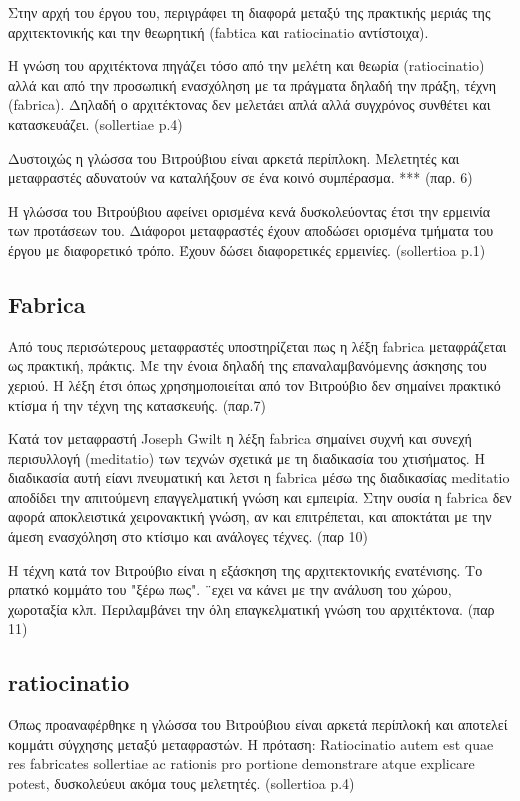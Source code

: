 Στην αρχή του έργου του, περιγράφει τη διαφορά μεταξύ της πρακτικής μεριάς της
αρχιτεκτονικής και την θεωρητική (fabtica και ratiocinatio αντίστοιχα).

Η γνώση του αρχιτέκτονα πηγάζει τόσο από την μελέτη και θεωρία (ratiocinatio)
αλλά και από την προσωπική ενασχόληση με τα πράγματα δηλαδή την πράξη, τέχνη
(fabrica). Δηλαδή ο αρχιτέκτονας δεν μελετάει απλά αλλά συγχρόνος συνθέτει και
κατασκευάζει. (sollertiae p.4)

Δυστοιχώς η γλώσσα του Βιτρούβιου είναι αρκετά περίπλοκη. Μελετητές και
μεταφραστές αδυνατούν να καταλήξουν σε ένα κοινό συμπέρασμα. *** (παρ. 6)

Η γλώσσα του Βιτρούβιου αφείνει ορισμένα κενά δυσκολεύοντας έτσι την ερμεινία
των προτάσεων του. Διάφοροι μεταφραστές έχουν αποδώσει ορισμένα τμήματα του
έργου με διαφορετικό τρόπο. Έχουν δώσει διαφορετικές ερμεινίες. (sollertioa p.1)

\subsection{Fabrica}

Από τους περισώτερους μεταφραστές υποστηρίζεται πως η λέξη fabrica μεταφράζεται
ως πρακτική, πράκτις. Με την ένοια δηλαδή της επαναλαμβανόμενης άσκησης του
χεριού. Η λέξη έτσι όπως χρησημοποιείται από τον Βιτρούβιο δεν σημαίνει πρακτικό
κτίσμα ή την τέχνη της κατασκευής. (παρ.7)

Κατά τον μεταφραστή Joseph Gwilt η λέξη fabrica σημαίνει συχνή και συνεχή
περισυλλογή (meditatio) των τεχνών σχετικά με τη διαδικασία του χτισήματος. Η
διαδικασία αυτή είανι πνευματική και λετσι η fabrica μέσω της διαδικασίας
meditatio αποδίδει την απιτούμενη επαγγελματική γνώση και εμπειρία. Στην ουσία η
fabrica δεν αφορά αποκλειστικά χειρονακτική γνώση, αν και επιτρέπεται, και
αποκτάται με την άμεση ενασχόληση στο κτίσιμο και ανάλογες τέχνες. (παρ 10)

Η τέχνη κατά τον Βιτρούβιο είναι η εξάσκηση της αρχιτεκτονικής ενατένισης. Το
ρπατκό κομμάτο του "ξέρω πως". ¨εχει να κάνει με την ανάλυση του χώρου,
χωροταξία κλπ. Περιλαμβάνει την όλη επαγκελματική γνώση του αρχιτέκτονα. (παρ
11)

\subsection{ratiocinatio}

Όπως προαναφέρθηκε η γλώσσα του Βιτρούβιου είναι αρκετά περίπλοκή και αποτελεί
κομμάτι σύγχησης μεταξύ μεταφραστών. Η πρόταση:  Ratiocinatio autem est quae res
fabricates sollertiae ac
rationis pro portione demonstrare atque explicare potest, δυσκολεύευι ακόμα τους
μελετητές. (sollertioa p.4)

